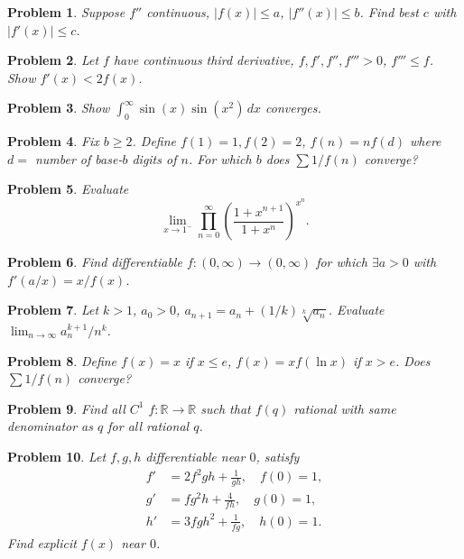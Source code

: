 \documentclass[12pt]{article}
\newtheorem{problem}{Problem}
\begin{document}
\begin{problem}
Suppose $f''$ continuous, $|f(x)|\leq a$, $|f''(x)|\leq b$. Find best $c$ with $|f'(x)|\leq c$.
\end{problem}

\begin{problem}
Let $f$ have continuous third derivative, $f,f',f'',f'''\!>0$, $f'''\leq f$. Show $f'(x)<2f(x)$. 
\end{problem}

\begin{problem}
Show $\int_0^\infty \sin(x)\sin(x^2)\,dx$ converges.
\end{problem}

\begin{problem}
Fix $b\geq2$. Define $f(1)=1,f(2)=2$, $f(n)=n f(d)$ where $d=$ number of base-$b$ digits of $n$. For which $b$ does $\sum 1/f(n)$ converge?
\end{problem}

\begin{problem}
Evaluate
\[
\lim_{x\to1^-}\prod_{n=0}^\infty \left(\frac{1+x^{n+1}}{1+x^n}\right)^{x^n}.
\]
\end{problem}

\begin{problem}
Find differentiable $f:(0,\infty)\to(0,\infty)$ for which $\exists a>0$ with $f'(a/x)=x/f(x)$.
\end{problem}

\begin{problem}
Let $k>1$, $a_0>0$, $a_{n+1}=a_n+(1/k)\sqrt[k]{a_n}$. Evaluate $\lim_{n\to\infty} a_n^{k+1}/n^k$.
\end{problem}

\begin{problem}
Define $f(x)=x$ if $x\leq e$, $f(x)=xf(\ln x)$ if $x>e$. Does $\sum 1/f(n)$ converge?
\end{problem}

\begin{problem}
Find all $C^1$ $f:\mathbb{R}\to\mathbb{R}$ such that $f(q)$ rational with same denominator as $q$ for all rational $q$.
\end{problem}

\begin{problem}
Let $f,g,h$ differentiable near $0$, satisfy
\begin{align*}
f'&=2f^2gh+\tfrac{1}{gh},\quad f(0)=1,\\
g'&=fg^2h+\tfrac{4}{fh},\quad g(0)=1,\\
h'&=3fgh^2+\tfrac{1}{fg},\quad h(0)=1.
\end{align*}
Find explicit $f(x)$ near $0$.
\end{problem}
\end{document}
